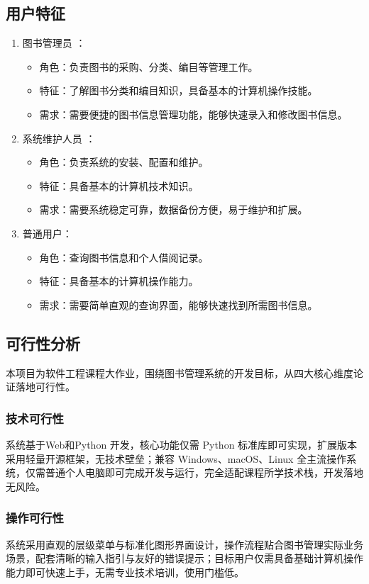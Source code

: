 \documentclass[UTF-8]{ctexart}
\begin{document}
\subsection{用户特征}
\begin{enumerate}[label=\arabic{enumi}]
\item 图书管理员 ：
\begin{itemize}
\item 角色：负责图书的采购、分类、编目等管理工作。
\item 特征：了解图书分类和编目知识，具备基本的计算机操作技能。
\item 需求：需要便捷的图书信息管理功能，能够快速录入和修改图书信息。
\end{itemize}

\item 系统维护人员 ：
\begin{itemize}
\item 角色：负责系统的安装、配置和维护。
\item 特征：具备基本的计算机技术知识。
\item 需求：需要系统稳定可靠，数据备份方便，易于维护和扩展。
\end{itemize}

\item 普通用户：
\begin{itemize}
\item 角色：查询图书信息和个人借阅记录。
\item 特征：具备基本的计算机操作能力。
\item 需求：需要简单直观的查询界面，能够快速找到所需图书信息。
\end{itemize}
\end{enumerate}

\subsection{可行性分析}
本项目为软件工程课程大作业，围绕图书管理系统的开发目标，从四大核心维度论证落地可行性。

\subsubsection{技术可行性}
系统基于Web和Python 开发，核心功能仅需 Python 标准库即可实现，扩展版本采用轻量开源框架，无技术壁垒；兼容 Windows、macOS、Linux 全主流操作系统，仅需普通个人电脑即可完成开发与运行，完全适配课程所学技术栈，开发落地无风险。 

\subsubsection{操作可行性}
系统采用直观的层级菜单与标准化图形界面设计，操作流程贴合图书管理实际业务场景，配套清晰的输入指引与友好的错误提示；目标用户仅需具备基础计算机操作能力即可快速上手，无需专业技术培训，使用门槛低。 
\end{document}
